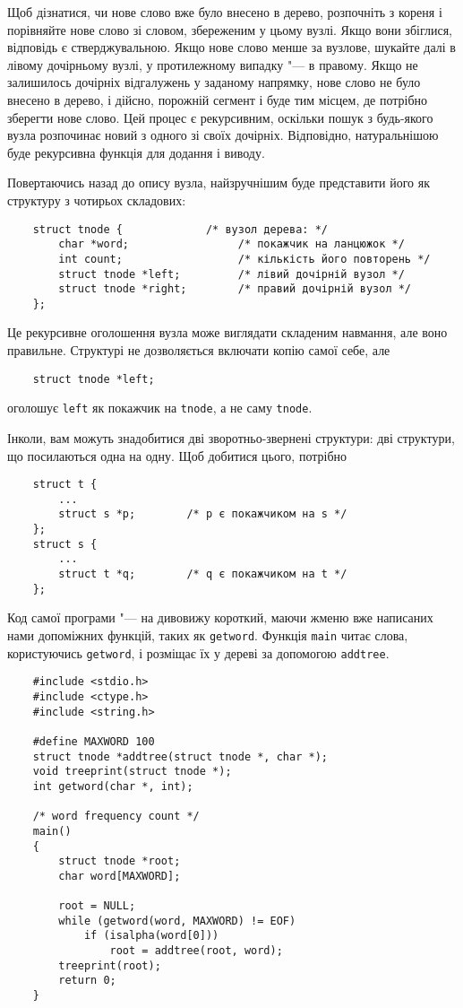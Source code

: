 \documentclass[a4paper,12pt]{book}
\begin{document}
  Щоб дізнатися, чи нове слово вже було внесено в дерево, розпочніть з кореня і
  порівняйте нове слово зі словом, збереженим у цьому вузлі. Якщо вони збіглися,
  відповідь є стверджувальною. Якщо нове слово менше за вузлове, шукайте далі в лівому
  дочірньому вузлі, у протилежному випадку "--- в правому. Якщо не залишилось дочірніх
  відгалужень у заданому напрямку, нове слово не було внесено в дерево, і дійсно,
  порожній сегмент і буде тим місцем, де потрібно зберегти нове слово. Цей процес є
  рекурсивним, оскільки пошук з будь-якого вузла розпочинає новий з одного зі своїх
  дочірніх. Відповідно, натуральнішою буде рекурсивна функція для додання і виводу.

  Повертаючись назад до опису вузла, найзручнішим буде представити його як структуру з
  чотирьох складових:
  \begin{verbatim}
    struct tnode {             /* вузол дерева: */
        char *word;                 /* покажчик на ланцюжок */
        int count;                  /* кількість його повторень */
        struct tnode *left;         /* лівий дочірній вузол */
        struct tnode *right;        /* правий дочірній вузол */
    };
  \end{verbatim}

  Це рекурсивне оголошення вузла може виглядати складеним навмання, але воно правильне.
  Структурі не дозволяється включати копію самої себе, але
  \begin{verbatim}
    struct tnode *left;
  \end{verbatim}
  оголошує \texttt{left} як покажчик на \texttt{tnode}, а не саму \texttt{tnode}.

  Інколи, вам можуть знадобитися дві зворотньо-звернені структури: дві структури, що
  посилаються одна на одну. Щоб добитися цього, потрібно
  \begin{verbatim}
    struct t {
        ...
        struct s *p;        /* p є покажчиком на s */
    };
    struct s {
        ...
        struct t *q;        /* q є покажчиком на t */
    };
  \end{verbatim}

  Код самої програми "--- на дивовижу короткий, маючи жменю вже написаних нами
  допоміжних функцій, таких як \texttt{getword}. Функція \texttt{main} читає слова,
  користуючись \texttt{getword}, і розміщає їх у дереві за допомогою \texttt{addtree}.

  \begin{verbatim}
    #include <stdio.h>
    #include <ctype.h>
    #include <string.h>

    #define MAXWORD 100
    struct tnode *addtree(struct tnode *, char *);
    void treeprint(struct tnode *);
    int getword(char *, int);

    /* word frequency count */
    main()
    {
        struct tnode *root;
        char word[MAXWORD];

        root = NULL;
        while (getword(word, MAXWORD) != EOF)
            if (isalpha(word[0]))
                root = addtree(root, word);
        treeprint(root);
        return 0;
    }
  \end{verbatim}
\end{document}
